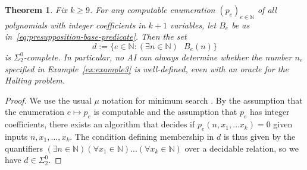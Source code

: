 \documentclass[10pt, a4paper, reqno]{amsart}
\numberwithin{equation}{section}
\renewcommand{\geq}{\geqslant}
\newtheorem{theorem}{Theorem}[section]
\theoremstyle{definition}
\theoremstyle{definition}
\begin{document}
\begin{theorem}\label{thm:presupposition}
Fix $k\geq9$. For any computable enumeration $(p_e)_{e\in\mathbb N}$ of all
polynomials with integer coefficients in $k+1$ variables, let $B_e$
be as in~\eqref{eq:presupposition-base-predicate}. Then the set
\[
    d:=\{e\in\mathbb N:(\exists n\in\mathbb N)\textrm{ }B_e(n)\}
\]
is $\Sigma^0_2$-complete. In particular, no AI can always determine
whether the number $n_e$ specified in Example~\ref{ex:example3} is well-defined, even with
an oracle for the Halting problem.
\end{theorem}
\begin{proof}
We use the usual $\mu$ notation for minimum search \cite{Soare2016}. By the assumption that the enumeration $e \mapsto p_e$ is computable and the assumption that $p_e$ has integer coefficients, there exists an algorithm that decides if $p_e(n,x_1, \ldots x_k) = 0$ given inputs $n,x_1,\dotsc,x_k$. The condition defining membership in $d$ is thus given by the quantifiers $(\exists n \in \mathbb{N})(\forall x_1 \in \mathbb{N}) ... (\forall x_k \in \mathbb{N})$ over a decidable relation, so we have $d\in\Sigma^0_2$.


\end{proof}
\end{document}

